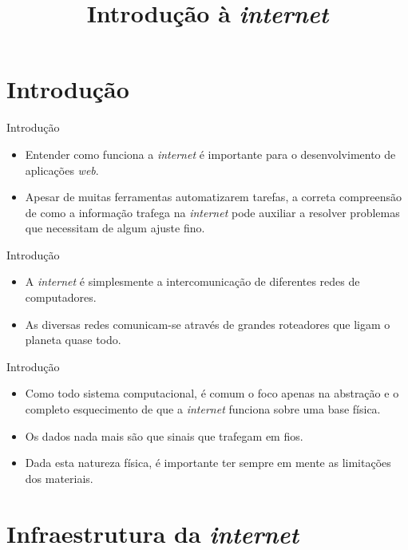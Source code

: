 \documentclass[11pt]{beamer}
\title{Introdução à \textit{internet}}
\author{}
\date{}
\begin{document}
    \begin{frame}[plain]
        \titlepage
    \end{frame}

    \section{Introdução}

    \begin{frame}{Introdução}
      \begin{itemize}
        \item Entender como funciona a \textit{internet} é importante para o desenvolvimento de aplicações \textit{web}.
        \item Apesar de muitas ferramentas automatizarem tarefas, a correta compreensão de como a informação trafega na \textit{internet} pode auxiliar a resolver problemas que necessitam de algum ajuste fino.
      \end{itemize}
    \end{frame}

    \begin{frame}{Introdução}
      \begin{itemize}
        \item A \textit{internet} é simplesmente a intercomunicação de diferentes redes de computadores.
        \item As diversas redes comunicam-se através de grandes roteadores que ligam o planeta quase todo.
      \end{itemize}
    \end{frame}

    \begin{frame}{Introdução}
      \begin{itemize}
        \item Como todo sistema computacional, é comum o foco apenas na abstração e o completo esquecimento de que a \textit{internet} funciona sobre uma base física.
        \item Os dados nada mais são que sinais que trafegam em fios.
        \item Dada esta natureza física, é importante ter sempre em mente as limitações dos materiais.
      \end{itemize}
    \end{frame}

    \section{Infraestrutura da \textit{internet}}
\end{document}

